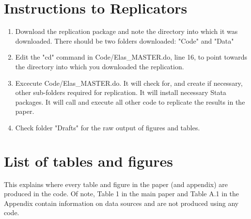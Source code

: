 \documentclass[11pt]{article}
\begin{document}
\section{Instructions to Replicators}
\begin{enumerate}
	\item Download the replication package and note the directory into which it was downloaded. There should be two folders downloaded: "Code" and "Data"
	\item Edit the "cd" command in Code/Elas\_MASTER.do, line 16, to point towards the directory into which you downloaded the replication.
	\item Excecute Code/Elas\_MASTER.do. It will check for, and create if necessary, other sub-folders required for replication. It will install necessary Stata packages. It will call and execute all other code to replicate the results in the paper.
	\item Check folder "Drafts" for the raw output of figures and tables.
\end{enumerate}

\section{List of tables and figures}
This explains where every table and figure in the paper (and appendix) are produced in the code. Of note, Table 1 in the main paper and Table A.1 in the Appendix contain information on data sources and are not produced using any code. 
\end{document}
